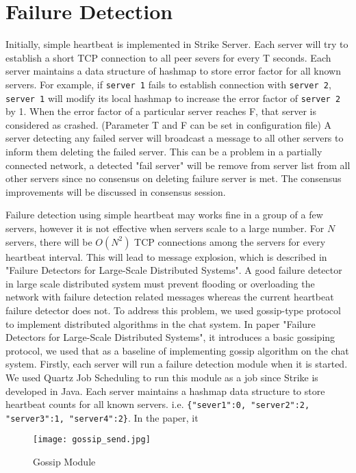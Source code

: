 \documentclass[dareport.tex]{subfiles}
\begin{document}
\section{Failure Detection}

Initially, simple heartbeat is implemented in Strike Server. Each server will try to establish a short TCP connection to all peer severs for every T seconds. Each server maintains a data structure of hashmap to store error factor for all known servers. For example, if \verb|server 1| fails to establish connection with \verb|server 2|, \verb|server 1| will modify its local hashmap to increase the error factor of \verb|server 2| by 1. When the error factor of a particular server reaches F, that server is considered as crashed. (Parameter T and F can be set in configuration file) A server detecting any failed server will broadcast a message to all other servers to inform them deleting the failed server. This can be a problem in a partially connected network, a detected "fail server" will be remove from server list from all other servers since no consensus on deleting failure server is met. The consensus improvements will be discussed in consensus session.

Failure detection using simple heartbeat may works fine in a group of a few servers, however it is not effective when servers scale to a large number. For $N$ servers, there will be $O(N^{2})$ TCP connections among the servers for every heartbeat interval. This will lead to message explosion, which is described in "Failure Detectors for Large-Scale Distributed Systems". A good failure detector in large scale distributed system must prevent flooding or overloading the network with failure detection related messages whereas the current heartbeat failure detector does not.
To address this problem, we used gossip-type protocol to implement distributed algorithms in the chat system. In paper "Failure Detectors for Large-Scale Distributed Systems", it introduces a basic gossiping protocol, we used that as a baseline of implementing gossip algorithm on the chat system. Firstly, each server will run a failure detection module when it is started. We used Quartz Job Scheduling to run this module as a job since Strike is developed in Java. Each server maintains a hashmap data structure to store heartbeat counts for all known servers. i.e. \verb|{"sever1":0, "server2":2, "server3":1, "server4":2}|. In the paper, it 

\begin{figure}[h]
\label{fig:Gossip Module}
\texttt{[image: gossip\_send.jpg]}
\caption{Gossip Module}
\centering
\end{figure}
\end{document}
